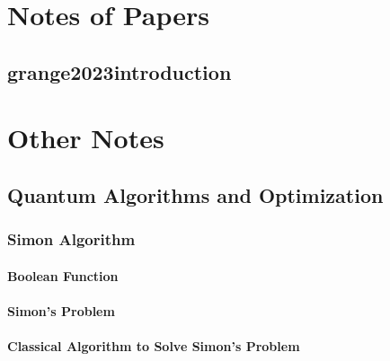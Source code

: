 \documentclass[
	11pt, %
	a4paper, %
]{LegrandOrangeBook}
\begin{document}
\part{Notes of Papers}


\chapter{grange2023introduction}







\part{Other Notes}

\chapter{Quantum Algorithms and Optimization}
\section{Simon Algorithm}
\subsection{Boolean Function}


\subsection{Simon's Problem}


\subsection{Classical Algorithm to Solve Simon's Problem}

\end{document}
